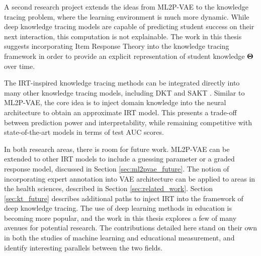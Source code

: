 A second research project extends the ideas from ML2P-VAE to the knowledge tracing problem, where the learning environment is much more dynamic. While deep knowledge tracing models are capable of predicting student success on their next interaction, this computation is not explainable. The work in this thesis suggests incorporating Item Response Theory into the knowledge tracing framework in order to provide an explicit representation of student knowledge $\boldsymbol{\Theta}$ over time.

The IRT-inspired knowledge tracing methods can be integrated directly into many other knowledge tracing models, including DKT \cite{piech2015} and SAKT \cite{pandey2019}. Similar to ML2P-VAE, the core idea is to inject domain knowledge into the neural architecture to obtain an approximate IRT model. This presents a trade-off between prediction power and interpretability, while remaining competitive with state-of-the-art models in terms of test AUC scores.

In both research areas, there is room for future work. ML2P-VAE can be extended to other IRT models to include a guessing parameter or a graded response model, discussed in Section \ref{sec:ml2pvae_future}. The notion of incorporating expert annotation into VAE architecture can be applied to areas in the health sciences, described in Section \ref{sec:related_work}. Section \ref{sec:kt_future} describes additional paths to inject IRT into the framework of deep knowledge tracing. The use of deep learning methods in education is becoming more popular, and the work in this thesis explores a few of many avenues for potential research. The contributions detailed here stand on their own in both the studies of machine learning and educational measurement, and identify interesting parallels between the two fields.

